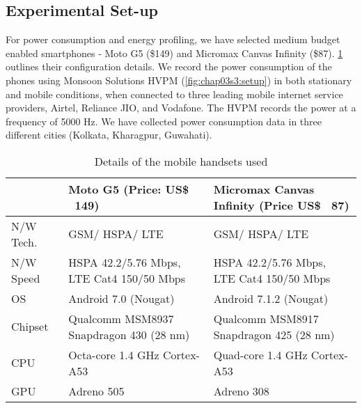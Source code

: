 
\subsection{Experimental Set-up}
For power consumption and energy profiling, we have selected medium budget  enabled smartphones -  Moto G5  (\$149) and Micromax Canvas Infinity (\$87). \tbl\ref{tab:chap03s3:handset_details} outlines their configuration details. We record the power consumption of the phones using Monsoon Solutions \ac{HVPM}\cite{HVPM, Yang2018,Geng2015} (\fig\ref{fig:chap03s3:setup}) in both stationary and mobile conditions, when connected to three leading mobile internet service providers, Airtel, Reliance JIO, and Vodafone. The \ac{HVPM} records the power at a frequency of 5000 Hz. We have collected power consumption data in three different cities (Kolkata, Kharagpur, Guwahati).
\begin{table}[!h]
    \scriptsize
    \centering
      \caption{Details of the mobile handsets used}
    \begin{tabular}{|p{1cm}||p{6cm}|p{6cm}|}
    \hline
         \textbf{}  & \textbf{Moto G5 (Price: US\$ ~149)} & \textbf{Micromax Canvas Infinity (Price US\$ ~87)}\\
          \hline \hline
         N/W Tech. & GSM/ HSPA/ LTE &  GSM/ HSPA/ LTE\\ \hline
         N/W Speed & HSPA 42.2/5.76 Mbps, LTE Cat4 150/50 Mbps & HSPA 42.2/5.76 Mbps, LTE Cat4 150/50 Mbps\\ \hline
         OS & Android 7.0 (Nougat) & Android 7.1.2 (Nougat) \\ \hline
         Chipset & Qualcomm MSM8937 Snapdragon 430 (28 nm) & Qualcomm MSM8917 Snapdragon 425 (28 nm)\\ \hline
         CPU & Octa-core 1.4 GHz Cortex-A53 & Quad-core 1.4 GHz Cortex-A53\\ \hline
         GPU & Adreno 505 & Adreno 308\\ \hline
    \end{tabular}
    \label{tab:chap03s3:handset_details}
\end{table}

